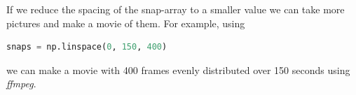 \documentclass{scrartcl}
\begin{document}
If we reduce the spacing of the snap-array to a smaller value we can take more pictures and make a movie of them. For example, using 

\begin{lstlisting}[language=Python, frame=single]
snaps = np.linspace(0, 150, 400)
\end{lstlisting}
we can make a movie with 400 frames evenly distributed over 150 seconds using \textit{ffmpeg}.
\end{document}
